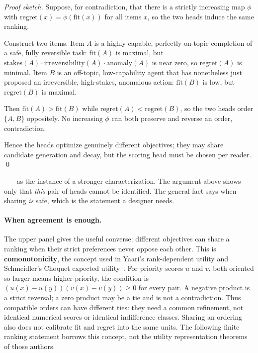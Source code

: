 \documentclass[11pt,a4paper]{article}
\theoremstyle{definition}
\theoremstyle{plain}
\begin{document}
\begin{proof}[Proof sketch]
\setlength{\parskip}{4pt plus 1pt}
Suppose, for contradiction, that there is a strictly increasing map $\phi$ with
$\mathrm{regret}(x)=\phi(\mathrm{fit}(x))$ for all items $x$, so the two heads induce
the same ranking.

Construct two items. Item $A$ is a highly capable, perfectly
on-topic completion of a safe, fully reversible task: $\mathrm{fit}(A)$ is maximal,
but $\mathrm{stakes}(A)\cdot\mathrm{irreversibility}(A)\cdot\mathrm{anomaly}(A)$ is
near zero, so $\mathrm{regret}(A)$ is minimal. Item $B$ is an off-topic, low-capability
agent that has nonetheless just proposed an irreversible, high-stakes, anomalous
action: $\mathrm{fit}(B)$ is low, but $\mathrm{regret}(B)$ is maximal.

Then
$\mathrm{fit}(A)>\mathrm{fit}(B)$ while $\mathrm{regret}(A)<\mathrm{regret}(B)$, so the
two heads order $\{A,B\}$ oppositely. No increasing $\phi$ can both preserve and reverse
an order, contradiction.

Hence the heads optimize genuinely different objectives; they
may share candidate generation and decay, but the scoring head must be chosen per
reader. \qed
\end{proof}

\noindent\Proved\ --- as the instance of a stronger characterization. The argument
above shows only that \emph{this} pair of heads cannot be identified. The general
fact says when sharing \emph{is} safe, which is the statement a designer needs.

\paragraph{When agreement is enough.}
The upper panel gives the useful converse: different objectives can share a
ranking when their strict preferences never oppose each other. This is
\textbf{comonotonicity}, the concept used in Yaari's rank-dependent utility
and Schmeidler's Choquet expected utility~.
For priority scores $u$ and $v$, both oriented so larger means higher
priority, the condition is
$(u(x)-u(y))(v(x)-v(y))\geq 0$ for every pair. A negative product is a
strict reversal; a zero product may be a tie and is not a contradiction.
Thus compatible orders can have different ties: they need a common
refinement, not identical numerical scores or identical indifference
classes. Sharing an ordering also does not calibrate fit and regret into
the same units. The following finite ranking statement borrows this
concept, not the utility representation theorems of those authors.
\end{document}
